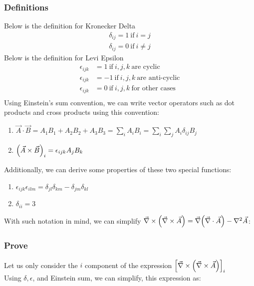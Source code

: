 \documentclass{article}
\begin{document}
\subsubsection*{Definitions}
Below is the definition for Kronecker Delta 
\begin{align*}
  \delta_{ij} = 1 \ \text{if} \ i = j \\
  \delta_{ij} = 0 \ \text{if} \ i \neq j
\end{align*}
Below is the definition for Levi Epsilon
\begin{align*}
  \epsilon_{ijk} &= 1 \ \text{if} \ i,j,k \ \text{are cyclic} \\
  \epsilon_{ijk} &= -1 \ \text{if} \ i,j,k \ \text{are anti-cyclic} \\ 
  \epsilon_{ijk} &= 0 \ \text{if} \ i,j,k \ \text{for other cases} \\ 
\end{align*}
Using Einstein's sum convention, we can write vector operators such as dot products and cross products using this convention:
\begin{enumerate}
  \item $\vec{A} \cdot \vec{B}  = A_1 B_1 + A_2 B_2 + A_3 B_3 = \sum_{i} A_i B_i = \sum_{i} \sum_{j}A_i \delta_{i j} B_j$
  \item $\qty(\vec{A} \times  \vec{B} )_i=\epsilon_{ijk} A_j B_k $
\end{enumerate}
Additionally, we can derive some properties of these two special functions:
\begin{enumerate}
  \item $\epsilon_{ijk} \epsilon_{ilm} = \delta_{jl} \delta_{km} - \delta_{jm}\delta_{kl}$
  \item $\delta_{ii} = 3$
\end{enumerate}
With such notation in mind, we can simplify $\vec{\nabla} \times \qty(\vec{\nabla} \times \vec{A}  ) = \vec{\nabla}\qty(\vec{\nabla} \cdot \vec{A} ) - \laplacian \vec{A}$:
\subsubsection*{Prove}
Let us only consider the $i$ component of the expression $\qty[\vec{\nabla} \times \qty(\vec{\nabla } \times \vec{A} ) ]_i$ \\ 
Using $\delta ,\epsilon $, and Einstein sum, we can simplify, this expression as:
\end{document}
